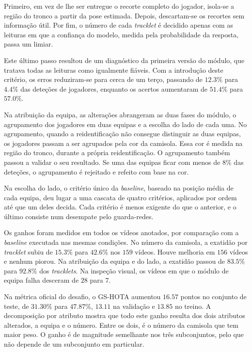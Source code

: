 Primeiro, em vez de lhe ser entregue o recorte completo do jogador, isola-se a região do tronco a partir da pose estimada. Depois, descartam-se os recortes sem informação útil. Por fim, o número de cada \emph{tracklet} é decidido apenas com as leituras em que a confiança do modelo, medida pela probabilidade da resposta, passa um limiar.

Este último passo resultou de um diagnóstico da primeira versão do módulo, que tratava todas as leituras como igualmente fiáveis. Com a introdução deste critério, os erros reduziram-se para cerca de um terço, passando de $12.3\%$ para $4.4\%$ das deteções de jogadores, enquanto os acertos aumentaram de $51.4\%$ para $57.0\%$.

Na atribuição da equipa, as alterações abrangeram as duas fases do módulo, o agrupamento dos jogadores em duas equipas e a escolha do lado de cada uma. No agrupamento, quando a reidentificação não consegue distinguir as duas equipas, os jogadores passam a ser agrupados pela cor da camisola. Essa cor é medida na região do tronco, durante a própria reidentificação. O agrupamento também passou a validar o seu resultado. Se uma das equipas ficar com menos de $8\%$ das deteções, o agrupamento é rejeitado e refeito com base na cor.

Na escolha do lado, o critério único da \emph{baseline}, baseado na posição média de cada equipa, deu lugar a uma cascata de quatro critérios, aplicados por ordem até que um deles decida. Cada critério é menos exigente do que o anterior, e o último consiste num desempate pelo guarda-redes.

Os ganhos foram medidos em todos os vídeos anotados, por comparação com a \emph{baseline} executada nas mesmas condições. No número da camisola, a exatidão por \emph{tracklet} subiu de $15.3\%$ para $42.6\%$ nos $159$ vídeos. Houve melhoria em $156$ vídeos e nenhum piorou. Na atribuição da equipa e do lado, a exatidão passou de $83.5\%$ para $92.8\%$ dos \emph{tracklets}. Na inspeção visual, os vídeos em que o módulo de equipa falha desceram de $28$ para $7$.

Na métrica oficial do desafio, o GS-HOTA aumentou $16.57$ pontos no conjunto de teste, de $31.30\%$ para $47.87\%$, $13.11$ na validação e $13.85$ no treino. A decomposição por atributo mostra que todo este ganho resulta dos dois atributos alterados, a equipa e o número. Entre os dois, é o número da camisola que tem maior peso. O ganho é de magnitude semelhante nos três subconjuntos, pelo que não depende de um subconjunto em particular.

